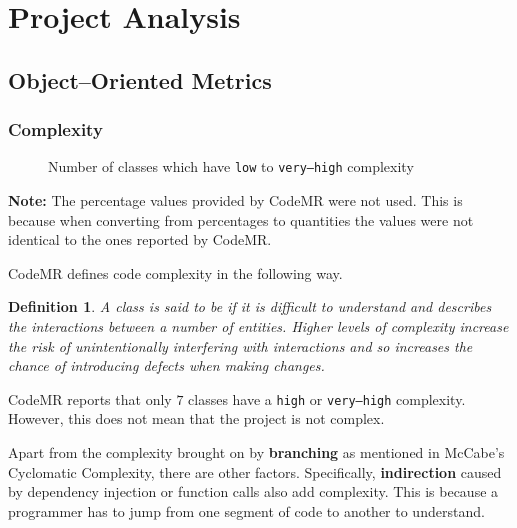 \documentclass[12pt]{article}
\newcommand{\note}[1]{\textbf{Note:} #1}
\DeclareRobustCommand{\ul}[1]{%
	\uline{\phantom{#1}}%
	\llap{\contour{white}{#1}}%
}
\newtheorem*{definition}{Definition}
\begin{document}
\section{Project Analysis}

\subsection{Object--Oriented Metrics}

\subsubsection{Complexity}

\begin{figure}[H]
    \centering
    \caption{Number of classes which have \texttt{low} to
    \texttt{very--high} complexity}
\end{figure}

\note{The percentage values provided by CodeMR were not used.
This is because when converting from percentages to quantities
the values were not identical to the ones reported by CodeMR.}

CodeMR defines code complexity in the following way.

\begin{definition}
    A class is said to be \ul{complex} if it is difficult to
    understand and describes the interactions between a number
    of entities. Higher levels of complexity increase the risk
    of unintentionally interfering with interactions and so
    increases the chance of introducing defects when making
    changes.
\end{definition}

CodeMR reports that only $7$ classes have a \texttt{high} or
\texttt{very--high} complexity. However, this does not mean that
the project is not complex.

Apart from the complexity brought on by \textbf{branching} as
mentioned in McCabe's Cyclomatic Complexity, there are other
factors. Specifically, \textbf{indirection} caused by dependency
injection or function calls also add complexity. This is because
a programmer has to jump from one segment of code to another to
understand.
\end{document}
